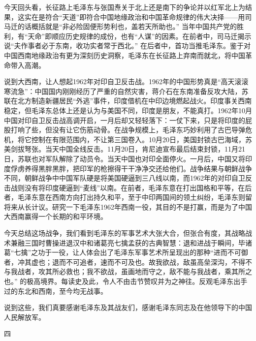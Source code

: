 \documentclass[UTF8, 12pt, a4paper]{ctexrep}
\begin{document}
今天回头看，长征路上毛泽东与张国焘关于北上还是南下的争论并以红军北上为结果，这实在是符合“天道”即符合中国地缘政治和中国革命规律的伟大决择——用司马迁的话概括就是“非必险固便形势利也，盖若天所助也。” 当年中国共产党的胜利，有“天命”即顺应历史规律的成份，也有“人谋”的因素。在前者中，司马迁揭示说“夫作事者必于东南，收功实者常于西北。” 在后者中，首功当推毛泽东。鉴于对中国西南地缘政治有更为深刻历史洞察，毛泽东在长征路上弃南而就北，将中国革命带入高潮。

说到大西南，让人想起1962年对印自卫反击战。1962年的中国形势真是“高天滚滚寒流急”：中国国内刚刚经历了严重的自然灾害，蒋介石在东南准备反攻大陆，苏联在北方制造新疆居民“外逃”事件，印度借机在中印边境燃起战火。印度事关西南稳定，但毛泽东总体上还是认为与美国不同，印度是朋友，不能真打。1962年10月中国对印自卫反击战高调开启，一月后却又轻轻落下：一仗下来，只是将印度的屁股打响了些，但没有让它伤筋动骨。在战争规模上，毛泽东巧妙利用了古巴导弹危机，将它控制在有限范围内，不让第三国卷入。10月20日，美国封锁古巴海域，苏美剑拔弩张。当天中国全线反击。11月20日，肯尼迪宣布最后结束封锁，11月21日，苏联也对军队解除了动员令。当天中国也对印全面停火。一月后，中国又将印度俘虏养得黑胖黑胖，把印军的枪擦得干干净净交还给他们。战争结果与朝鲜战争不同，朝鲜战争中中国军队硬是将美国硬逼到三八线以南，而1962年的对印自卫反击战则没有将印度硬逼到“麦线”以南。在前者，毛泽东意在打出国格和平等，在后者，毛泽东意在西南方向打出持久和平，至于中印两国间的领土纠纷，毛泽东则留将来从长计议。研究一下毛泽东1962年西南一役，其目的不是打赢，而是为了中国大西南赢得一个长期的和平环境。

今天总结这场战争，我们看到毛泽东的军事艺术大张大合，但张合有度，其战略战术兼融三国时曹操进退汉中和诸葛亮七擒孟获的古典智慧：退和进战于瞬间，毕诸葛“七擒”之功于一役，让人体会出了毛泽东军事艺术所呈现出的那种“进而不可御者，冲其虚也；退而不可追者，速而不可及也。故我欲战，敌虽高垒深沟，不得不与我战者，攻其所必救也；我不欲战，虽画地而守之，敌不能与我战者，乘其所之也。” 的极高境界。每读史及此，令人不由击节赞叹并为之神往。反观毛泽东出手过的东北和西南，至今均无战事。

说到这些，我们真要感谢毛泽东及其战友们，感谢毛泽东同志及在他领导下的中国人民解放军。

四
\end{document}
